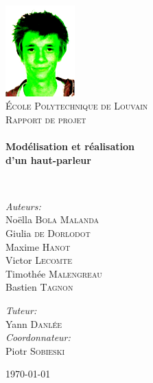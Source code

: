 \begin{titlepage}
\begin{center}

\includegraphics[width=0.2\textwidth]{img/max_vert}~\\[1cm]

\textsc{\LARGE École Polytechnique de Louvain}\\[1.5cm]

\textsc{\Large Rapport de projet}\\[0.5cm]

\HRule \\[0.4cm]
{ \huge \bfseries Modélisation et réalisation \\ d’un haut-parleur \\[0.4cm] }

\HRule \\[1.5cm]

\begin{minipage}{0.45\textwidth}
\begin{flushleft} \large
\emph{Auteurs:}\\
\quad Noëlla \textsc{Bola Malanda}\\
\quad Giulia \textsc{de Dorlodot}\\
\quad Maxime \textsc{Hanot}\\
\quad Victor \textsc{Lecomte}\\
\quad Timothée \textsc{Malengreau}\\
\quad Bastien \textsc{Tagnon}
\end{flushleft}
\end{minipage}
\qquad \qquad
\begin{minipage}{0.3\textwidth}
\begin{flushleft} \large
\emph{Tuteur:} \\
\quad Yann \textsc{Danlée}\\
\emph{Coordonnateur:}\\
\quad Piotr \textsc{Sobieski}\\
\vspace{3\baselineskip}
\end{flushleft}
\end{minipage}

\vfill

{\large \today}

\end{center}
\end{titlepage}

